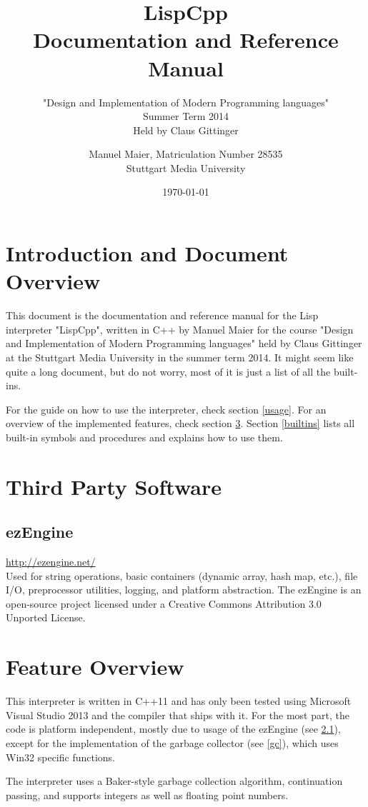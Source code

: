 \documentclass[a4paper]{scrartcl}
\title{LispCpp\\
	Documentation and Reference Manual}
\subtitle{"Design and Implementation of Modern Programming languages"\\
	Summer Term 2014\\
	Held by Claus Gittinger}
\author{Manuel Maier, Matriculation Number 28535\\
		Stuttgart Media University}
\date{\today}
\newcommand{\lisp}{Lisp}
\begin{document}
\maketitle
\tableofcontents
\clearpage

\section{Introduction and Document Overview}
\label{overview}
	This document is the documentation and reference manual for the \lisp{} interpreter "LispCpp", written in C++ by Manuel Maier for the course "Design and Implementation of Modern Programming languages" held by Claus Gittinger at the Stuttgart Media University in the summer term 2014. It might seem like quite a long document, but do not worry, most of it is just a list of all the built-ins.

	For the guide on how to use the interpreter, check section \ref{usage}. For an overview of the implemented features, check section \ref{features}. Section \ref{builtins} lists all built-in symbols and procedures and explains how to use them.

\section{Third Party Software}
\label{thirdparty}
\subsection{ezEngine}
\label{ez}
	\url{http://ezengine.net/}\\
	Used for string operations, basic containers (dynamic array, hash map, etc.), file I\slash{}O, preprocessor utilities, logging, and platform abstraction. The ezEngine is an open-source project licensed under a Creative Commons Attribution 3.0 Unported License.

\section{Feature Overview}
\label{features}
	This interpreter is written in C++11 and has only been tested using Microsoft Visual Studio 2013 and the compiler that ships with it. For the most part, the code is platform independent, mostly due to usage of the ezEngine (see \ref{ez}), except for the implementation of the garbage collector (see \ref{gc}), which uses Win32 specific functions.

	The interpreter uses a Baker-style garbage collection algorithm, continuation passing, and supports integers as well as floating point numbers.
\end{document}
